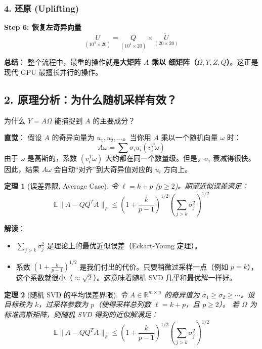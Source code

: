 \documentclass[11pt,a4paper]{ctexart}
\newtheorem{theorem}{定理}[section]
\theoremstyle{definition}
\theoremstyle{remark}
\begin{document}
\subsubsection*{4. 还原 (Uplifting)}
\textbf{Step 6: 恢复左奇异向量}
\[
\underset{(10^4 \times 20)}{U} = \underset{(10^4 \times 20)}{Q} \times \underset{(20 \times 20)}{\tilde{U}}
\]

\textbf{总结}：
整个流程中，最重的操作就是\textbf{大矩阵 $A$ 乘以 细矩阵（$\Omega, Y, Z, Q$）}。这正是现代 GPU 最擅长并行的操作。

\subsection{2. 原理分析：为什么随机采样有效？}

为什么 $Y=A\Omega$ 能捕捉到 $A$ 的主要成分？

\textbf{直觉}：
假设 $A$ 的奇异向量为 $u_1, u_2, \dots$。当你用 $A$ 乘以一个随机向量 $\omega$ 时：
\[ A\omega = \sum \sigma_i u_i (v_i^T \omega) \]
由于 $\omega$ 是高斯的，系数 $(v_i^T \omega)$ 大约都在同一个数量级。但是，$\sigma_i$ 衰减得很快。因此，结果 $A\omega$ 会自动“对齐”到大奇异值对应的 $u_i$ 方向上。

\begin{theorem}[误差界限, Average Case]
令 $\ell = k + p$ ($p \geq 2$)。期望近似误差满足：
\[
\mathbb{E} \| A - Q Q^T A \|_F \leq \left( 1 + \frac{k}{p-1} \right)^{1/2} \left( \sum_{j > k} \sigma_j^2 \right)^{1/2}
\]
\end{theorem}
\textbf{解读}：
\begin{itemize}
    \item $\sum_{j > k} \sigma_j^2$ 是理论上的最优近似误差（Eckart-Young 定理）。
    \item 系数 $(1 + \frac{k}{p-1})^{1/2}$ 是我们付出的代价。只要稍微过采样一点（例如 $p=k$），这个系数就很小（$\approx \sqrt{2}$）。这意味着随机 SVD 几乎和最优解一样好。
\end{itemize}

\begin{theorem}[随机 SVD 的平均误差界限]
令 $A \in \mathbb{R}^{m \times n}$ 的奇异值为 $\sigma_1 \geq \sigma_2 \geq \cdots$。设目标秩为 $k$，过采样参数为 $p$（使得采样总列数 $\ell = k+p$，且 $p \geq 2$）。
若 $\Omega$ 为标准高斯矩阵，则随机 SVD 得到的近似解满足：
\[
\mathbb{E} \| A - Q Q^T A \|_F \leq \left( 1 + \frac{k}{p-1} \right)^{1/2} \left( \sum_{j > k} \sigma_j^2 \right)^{1/2}
\]
\end{theorem}
\end{document}
